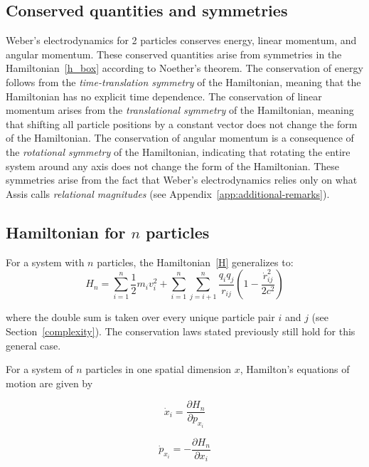 \documentclass[12pt,a4paper]{article}
\theoremstyle{definition}
\theoremstyle{remark}
\begin{document}
\subsection{Conserved quantities and symmetries}
Weber's electrodynamics for 2 particles conserves energy, linear momentum, and angular momentum. These conserved quantities arise from symmetries in the Hamiltonian~\eqref{h_box} according to Noether's theorem. The conservation of energy follows from the \textit{time-translation symmetry} of the Hamiltonian, meaning that the Hamiltonian has no explicit time dependence. The conservation of linear momentum arises from the \textit{translational symmetry} of the Hamiltonian, meaning that shifting all particle positions by a constant vector does not change the form of the Hamiltonian. The conservation of angular momentum is a consequence of the \textit{rotational symmetry} of the Hamiltonian, indicating that rotating the entire system around any axis does not change the form of the Hamiltonian. These symmetries arise from the fact that Weber's electrodynamics relies only on what Assis calls \textit{relational magnitudes} (see Appendix~\ref{app:additional-remarks}).

\subsection{Hamiltonian for \texorpdfstring{$n$}{n} particles}\label{n-body-hamiltonian}
For a system with $n$ particles, the Hamiltonian~\eqref{H} generalizes to:
\begin{equation}\label{hamiltonian}
    H_n = \sum_{i=1}^{n} \frac{1}{2} m_i v_i^2 + \sum_{i=1}^{n} \sum_{j=i+1}^{n} \frac{q_i q_j}{r_{ij}} \left(1 - \frac{\dot{r}_{ij}^2}{2 c^2}\right)
\end{equation}

where the double sum is taken over every unique particle pair $i$ and $j$ (see Section~\ref{complexity}). The conservation laws stated previously still hold for this general case.

For a system of $n$ particles in one spatial dimension $x$, Hamilton's equations of motion are given by

\begin{equation}\label{xdot}
    \dot{x}_i = \frac{\partial H_n}{\partial p_{x_i}}
\end{equation}

\begin{equation}\label{pdot}
    \dot{p}_{x_i} = -\frac{\partial H_n}{\partial x_i}
\end{equation}
\end{document}
